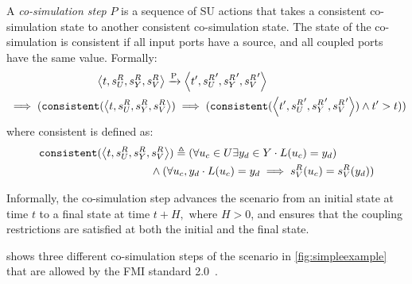 \begin{definition}\label{def:comsim_step}
  A \emph{co-simulation step} $P$ is a sequence of SU actions that takes a consistent co-simulation state to another consistent  co-simulation state. 
  The state of the co-simulation is consistent if all input ports have a source, and all coupled ports have the same value.
  Formally:
  \begin{align*}
    &\qquad \qquad \qquad \qquad  \left\langle t,s^{R}_{U}, s^{R}_{Y},s^{R}_{V} \right\rangle 
    \xrightarrow[\text{}]{\text{P}}  \left\langle {t}',{s^{R}_{U}}', {s^{R}_{Y}}',{s^{R}_{V}}' \right\rangle  \\
    &\implies
    (\mathtt{consistent}( \left\langle t,s^{R}_{U}, s^{R}_{Y},s^{R}_{V} \right\rangle ) 
    \implies
    (\mathtt{consistent}( \left\langle {t}',{s^{R}_{U}}', {s^{R}_{Y}}',{s^{R}_{V}}' \right\rangle )
    \land {t}' > t))
  \end{align*}
  where consistent is defined as:
  \begin{align*}
    &\mathtt{consistent}( \left\langle t,s^{R}_{U}, s^{R}_{Y},s^{R}_{V} \right\rangle ) \triangleq 
    (\forall u_{c} \in U
    \exists y_{d} \in Y 
    \cdot L(u_{c}) = y_{d})  \nonumber \\
    &\qquad \qquad \qquad \qquad \qquad \land
    (\forall u_{c}, y_{d} \cdot L(u_{c}) = y_{d} 
    \implies
    s^{R}_{V}(u_{c}) = s^{R}_{V}(y_{d}))
  \end{align*}
\end{definition}


Informally, the co-simulation step advances the scenario from an initial state at time $t$ to a final state at time $t+H, \textrm{ where } H > 0$, and ensures that the coupling restrictions are satisfied at both the initial and the final state.

 shows three different co-simulation steps of the scenario in \cref{fig:simpleexample} that are allowed by the FMI standard 2.0~\cite{FMI2014}. 

